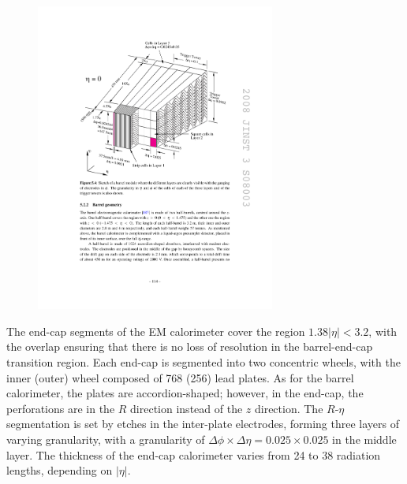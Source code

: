 \begin{figure}[ht]
    \centering
    \includegraphics[width=0.7\textwidth]{fig/detector/em_calo_accordion.pdf}
    \caption[]{\cite{bib:Aad:2008zzm}}
\label{chap:detector:fig:accordion}
\end{figure}

The end-cap segments of the EM calorimeter cover the region
$1.38|\eta|<3.2$, with the overlap ensuring that there is no loss of
resolution in the barrel-end-cap transition region. Each end-cap is
segmented into two concentric wheels, with the inner (outer) wheel composed of
768 (256) lead plates. As for the barrel calorimeter, the plates are
accordion-shaped; however, in the end-cap, the perforations are in the
$R$ direction instead of the $z$ direction. The $R$-$\eta$
segmentation is set by etches in the inter-plate electrodes, forming
three layers of varying granularity, with a granularity of $\Delta\phi
\times \Delta\eta = 0.025 \times 0.025$ in the middle layer. The
thickness of the
end-cap calorimeter varies from 24 to 38 radiation lengths, depending on
$|\eta|$. 

